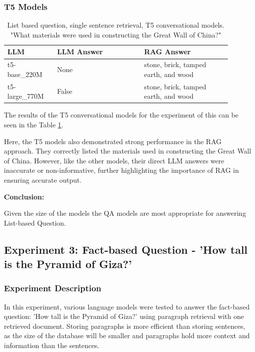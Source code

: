 \documentclass{wseas}
\begin{document}
\subsubsection{T5 Models}

\begin{table}[htbp]
  \centering
  \label{tab:experiment_Q_listBased_R_1Sentence_Q_listBased_M_T5Models_table} 
  \caption{List based question, single sentence retrieval, T5 conversational models. "What materials were used in constructing the Great Wall of China?"} %
  \begin{tabular}{|p{0.20\linewidth}|p{0.35\linewidth}|p{0.35\linewidth}|}
    \hline
    \textbf{LLM} & \textbf{LLM Answer} & \textbf{RAG Answer} \\ \hline
    t5-base\_220M & None & stone, brick, tamped earth, and wood \\ \hline
    t5-large\_770M & False & stone, brick, tamped earth, and wood \\ \hline
  \end{tabular}
\end{table}

The results of the T5 conversational models for the experiment of this
can be seen in the Table \ref{tab:experiment_Q_listBased_R_1Sentence_Q_listBased_M_T5Models_table}.

Here, the T5 models also demonstrated strong performance in the RAG approach.
They correctly listed the materials used in constructing the Great Wall of
China. However, like the other models, their direct LLM answers were
inaccurate or non-informative, further highlighting the importance of
RAG in ensuring accurate output.

\textbf{Conclusion:}

Given the size of the models the QA models are most appropriate for
answering List-based Question.


\subsection{Experiment 3: Fact-based Question - 'How tall is the Pyramid of Giza?'}

\subsubsection{Experiment Description}

In this experiment, various language models were tested to answer the
fact-based question: 'How tall is the Pyramid of Giza?' using
paragraph retrieval with one retrieved document. Storing paragraphs is
more efficient than storing sentences, as the size of the database will
be smaller and paragraphs hold more context and information than the
sentences. 
\end{document}
